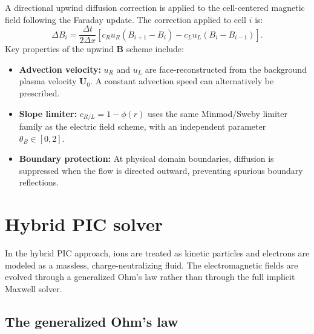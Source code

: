 \documentclass[a4paper, 11pt]{article}
\begin{document}
A directional upwind diffusion correction is applied to the cell-centered magnetic field following the Faraday update. The correction applied to cell $i$ is:
\begin{equation}
\Delta B_i = \frac{\Delta t}{2\Delta x} \left[ c_R u_R (B_{i+1} - B_i) - c_L u_L (B_i - B_{i-1}) \right].
\end{equation}
Key properties of the upwind $\mathbf{B}$ scheme include:
\begin{itemize}
  \item \textbf{Advection velocity:} $u_R$ and $u_L$ are face-reconstructed from the background plasma velocity $\mathbf{U}_0$. A constant advection speed can alternatively be prescribed.
  \item \textbf{Slope limiter:} $c_{R/L} = 1 - \phi(r)$ uses the same Minmod/Sweby limiter family as the electric field scheme, with an independent parameter $\theta_B \in [0, 2]$.
  \item \textbf{Boundary protection:} At physical domain boundaries, diffusion is suppressed when the flow is directed outward, preventing spurious boundary reflections.
\end{itemize}

\section{Hybrid PIC solver}

In the hybrid PIC approach, ions are treated as kinetic particles and electrons are modeled as a massless, charge-neutralizing fluid. The electromagnetic fields are evolved through a generalized Ohm's law rather than through the full implicit Maxwell solver.

\subsection{The generalized Ohm's law}
\end{document}
